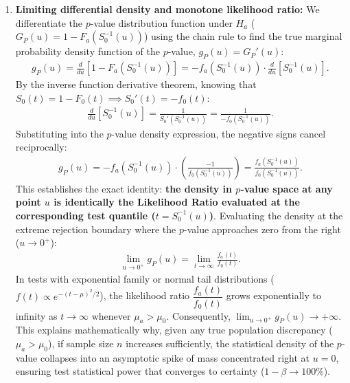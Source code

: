 \begin{solucion}
\begin{enumerate}
		\item \textbf{Limiting differential density and monotone likelihood ratio:}
		We differentiate the $p$-value distribution function under $H_a$ ($G_P(u) = 1 - F_a(S_0^{-1}(u))$) using the chain rule to find the true marginal probability density function of the $p$-value, $g_P(u) = G_P'(u)$:
		\begin{align}
			g_P(u) = \frac{d}{du}\left[ 1 - F_a\left( S_0^{-1}(u) \right) \right] = -f_a\left( S_0^{-1}(u) \right) \cdot \frac{d}{du}\left[ S_0^{-1}(u) \right].
		\end{align}
		By the inverse function derivative theorem, knowing that $S_0(t) = 1 - F_0(t) \implies S_0'(t) = -f_0(t)$:
		\begin{align}
			\frac{d}{du}\left[ S_0^{-1}(u) \right] = \frac{1}{S_0'\left( S_0^{-1}(u) \right)} = \frac{1}{-f_0\left( S_0^{-1}(u) \right)}.
		\end{align}
		Substituting into the $p$-value density expression, the negative signs cancel reciprocally:
		\begin{align}
			g_P(u) = -f_a\left( S_0^{-1}(u) \right) \cdot \left( \frac{-1}{f_0\left( S_0^{-1}(u) \right)} \right) = \frac{f_a\left( S_0^{-1}(u) \right)}{f_0\left( S_0^{-1}(u) \right)}.
		\end{align}
		This establishes the exact identity: \textbf{the density in $p$-value space at any point $u$ is identically the Likelihood Ratio evaluated at the corresponding test quantile ($t = S_0^{-1}(u)$)}.
		Evaluating the density at the extreme rejection boundary where the $p$-value approaches zero from the right ($u \to 0^+$):
		\begin{align}
			\lim_{u \to 0^+} g_P(u) = \lim_{t \to \infty} \frac{f_a(t)}{f_0(t)}.
		\end{align}
		In tests with exponential family or normal tail distributions ($f(t) \propto e^{-(t-\mu)^2/2}$), the likelihood ratio $\dfrac{f_a(t)}{f_0(t)}$ grows exponentially to infinity as $t \to \infty$ whenever $\mu_a > \mu_0$.
		Consequently, $\lim_{u \to 0^+} g_P(u) \to +\infty$.
		This explains mathematically why, given any true population discrepancy ($\mu_a > \mu_0$), if sample size $n$ increases sufficiently, the statistical density of the $p$-value collapses into an asymptotic spike of mass concentrated right at $u = 0$, ensuring test statistical power that converges to certainty ($1-\beta \to 100\%$).
	\end{enumerate}
\end{solucion}
